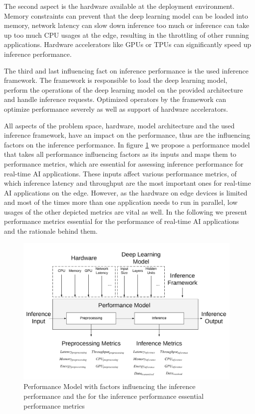 The second aspect is the hardware available at the deployment environment. 
Memory constraints can prevent that the deep learning model can be loaded into memory, network latency can slow down inference too much or inference can take up too much CPU usages at the edge, resulting in the throttling of other running applications.
Hardware accelerators like GPUs or TPUs can significantly speed up inference performance.

The third and last influencing fact on inference performance is the used inference framework. 
The framework is responsible to load the deep learning model, perform the operations of the deep learning model on the provided architecture and handle inference requests.
Optimized operators by the framework can optimize performance severely as well as support of hardware accelerators.


All aspects of the problem space, hardware, model architecture and the used inference framework, have an impact on the performance, thus are the influencing factors on the inference performance.
In figure \ref{fig:perfmodel} we propose a performance model that takes all performance influencing factors as its inputs and maps them to performance metrics, which are essential for assessing inference performance for real-time AI applications.
These inputs affect various performance metrics, of which inference latency and throughput are the most important ones for real-time AI applications on the edge. However, as the hardware on edge devices is limited and most of the times more than one application needs to run in parallel, low usages of the other depicted metrics are vital as well.
In the following we present performance metrics essential for the performance of real-time AI applications and the rationale behind them.
\begin{figure}[!htb]
\centering
\includegraphics[width=0.99\textwidth]{./Bilder/PerformanceModel.png}
\caption{Performance Model with factors influencing the inference performance and the for the inference performance essential performance metrics}
\label{fig:perfmodel}
\end{figure}



